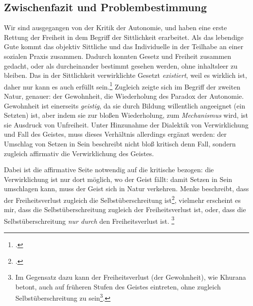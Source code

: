 \documentclass[12pt, a4paper, openany]{report}
\begin{document}
\subsection{Zwischenfazit und Problembestimmung}\label{zwisschenfazit}
Wir sind ausgegangen von der Kritik der Autonomie, und haben eine erste Rettung der Freiheit in dem Begriff der Sittlichkeit erarbeitet. 
Als das lebendige Gute kommt das objektiv Sittliche und das Individuelle in der Teilhabe an einer sozialen Praxis zusammen. 
Dadurch konnten Gesetz und Freiheit zusammen gedacht, oder als durcheinander bestimmt gesehen werden, ohne inhaltsleer zu bleiben.
Das in der Sittlichkeit verwirklichte Gesetzt \emph{existiert}, weil es wirklich ist, daher nur kann es auch erfüllt sein.\footcite[Vgl.][57]{menke_autonomie_2018}
Zugleich zeigte sich im Begriff der zweiten Natur, genauer: der Gewohnheit, die Wiederholung des Paradox der Autonomie.
Gewohnheit ist einerseits \emph{geistig}, da sie durch Bildung willentlich angeeignet (ein Setzten) ist, aber indem sie zur bloßen Wiederholung, zum \emph{Mechanismus} wird, ist sie  Ausdruck von Unfreiheit.
Unter Hinzunahme der Dialektik von Verwirklichung und Fall des Geistes, muss dieses Verhältnis allerdings ergänzt werden:
der Umschlag von Setzen in Sein beschreibt nicht bloß kritisch denn Fall, sondern zugleich affirmativ die Verwirklichung des Geistes.
\begin{comment}
die zwei Seiten der Gewohnheit -- geistiges Setzen und mechanisches Verselbstständigen -- hatten wir im letzten Abschnitt als den Umschlag von Setzen in Sein ausgedrückt. 
Dieser Umschlag beschreibt zugleich kritisch die Selbstverfehlung des Geistes, wie affirmativ, dessen Verwirklichung.\footcite[Vgl.][145]{menke_autonomie_2018}
\end{comment}
Dabei ist die affirmative Seite notwendig auf die kritische bezogen: 
die Verwirklichung ist nur dort möglich, wo der Geist fällt: 
damit Setzen in Sein umschlagen kann, muss der Geist sich in Natur verkehren. 
Menke beschreibt, dass der Freiheitsverlust zugleich die Selbstüberschreitung ist\footcite[Vgl.][145]{menke_autonomie_2018}, vielmehr erscheint es mir, dass die Selbstüberschreitung zugleich der Freiheitsverlust ist, oder, dass die Selbstüberschreitung \emph{nur durch} den Freiheitsverlust ist.%
\footnote{
    Im Gegensatz dazu kann der Freiheitsverlust (der Gewohnheit), wie Khurana betont, auch auf früheren Stufen des Geistes eintreten, ohne zugleich Selbstüberschreitung zu sein\footcite[vgl. z.B.][§88, S. 433. Khurana spricht hier von der Gewohnheit auf den vor-sittlichen Stufen des Geistes]{khurana_freiheit_2017}.
}
\end{document}
